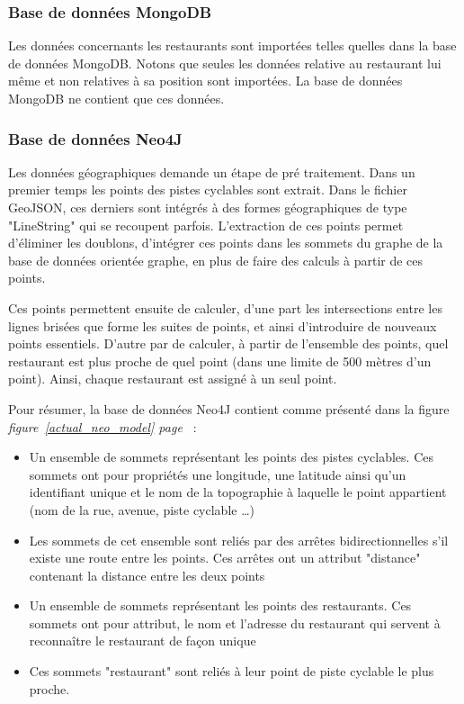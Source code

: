 \documentclass[12pt]{article}
\begin{document}
\subsubsection{Base de données MongoDB}

    Les données concernants les restaurants sont importées telles quelles dans la base de données MongoDB. Notons que seules les données relative au restaurant lui même et non relatives à sa position sont importées. La base de données MongoDB ne contient que ces données.

\subsubsection{Base de données Neo4J}

    Les données géographiques demande un étape de pré traitement. Dans un premier temps les points des pistes cyclables sont extrait. Dans le fichier GeoJSON, ces derniers sont intégrés à des formes géographiques de type "LineString" qui se recoupent parfois. L'extraction de ces points permet d'éliminer les doublons, d'intégrer ces points dans les sommets du graphe de la base de données orientée graphe, en plus de faire des calculs à partir de ces points.

    Ces points permettent ensuite de calculer, d'une part les intersections entre les lignes brisées que forme les suites de points, et ainsi d'introduire de nouveaux points essentiels. D'autre par de calculer, à partir de l'ensemble des points, quel restaurant est plus proche de quel point (dans une limite de 500 mètres d'un point). Ainsi, chaque restaurant est assigné à un seul point.
    
    Pour résumer, la base de données Neo4J contient comme présenté dans la figure \emph{figure~\ref{actual_neo_model} page~\pageref{actual_neo_model}} :

    \begin{itemize}
        \item Un ensemble de sommets représentant les points des pistes cyclables. Ces sommets ont pour propriétés une longitude, une latitude ainsi qu'un identifiant unique et le nom de la topographie à laquelle le point appartient (nom de la rue, avenue, piste cyclable \dots)
        \item Les sommets de cet ensemble sont reliés par des arrêtes bidirectionnelles s'il existe une route entre les points. Ces arrêtes ont un attribut "distance" contenant la distance entre les deux points
        \item Un ensemble de sommets représentant les points des restaurants. Ces sommets ont pour attribut, le nom et l'adresse du restaurant qui servent à reconnaître le restaurant de façon unique
        \item Ces sommets "restaurant" sont reliés à leur point de piste cyclable le plus proche.
    \end{itemize}
        
\end{document}
